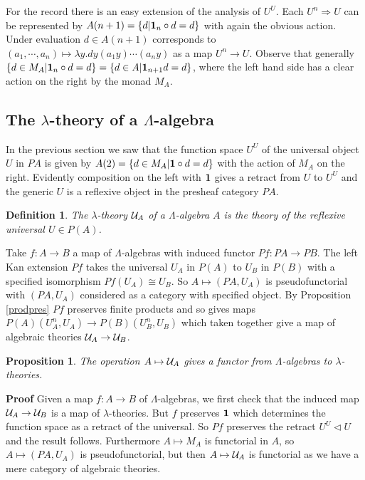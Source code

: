\documentclass[12pt, amstex, amssymb]{article}
\newtheorem{proposition}[theorem]{Proposition}
\newtheorem{definition}[theorem]{Definition}
\newcommand{\ret}{\triangleleft}
\newcommand{\mcat}{\cal}
\newcommand{\app}{{\bf 1}}
\begin{document}
For the record there is an easy extension of
the analysis of $U^U$. Each $U^n \Rightarrow U$ can be represented by
${A}(n+1) = \{ d | \app_n \circ d = d \}$ with again the obvious
action. Under evaluation $d \in A(n+1)$ corresponds to
$(a_1, \cdots , a_n) \mapsto \lambda y. dy(a_1y) \cdots (a_ny)$
as a map $U^n \to U$. Observe that generally 
$\{ d \in M_A | \app_n \circ d = d \} = \{d \in A | \app_{n+1}d = d \}$,
where the left hand side has a clear action on the right by
the monad $M_A$.

\subsection{The $\lambda$-theory of a $\Lambda$-algebra}
In the previous section we saw that the function space $U^U$ of
the universal object $U$ in $PA$ is given 
by $A(2) = \{d \in M_A | \app \circ d = d \}$ with the 
action of $M_A$ on the right. Evidently composition 
on the left with $\app$ gives a retract from $U$ to $U^U$
and the generic $U$ is a reflexive object in the 
presheaf category $PA$. 

\begin{definition}
The $\lambda$-theory ${\mcat U}_A$ 
of a $\Lambda$-algebra $A$ is the theory 
of the reflexive universal $U \in P(A)$. 
\end{definition}
Take $f: A \to B$ a map of $\Lambda$-algebras
with induced functor $Pf: PA \to PB$.
The left Kan extension $Pf$ takes the universal $U_A$ in $P(A)$ to 
$U_B$ in $P(B)$ with a specified isomorphism
$Pf(U_A) \cong U_B$. So
$A \mapsto (PA,U_A)$ is pseudofunctorial with $(PA,U_A)$
considered as a category with specified object. 
By Proposition \ref{prodpres} $Pf$ preserves finite
products and so gives maps 
$P(A)(U_A^n,U_A) \to P(B)(U_B^n,U_B)$
which taken together give a map of algebraic 
theories ${\mcat U}_A \to {\mcat U}_B$.
\begin{proposition}\label{universal}
The operation $A \mapsto {\mcat U}_A$ gives a functor
from $\Lambda$-algebras to $\lambda$-theories. 
\end{proposition}
{\bf Proof}
Given a map $f:A \to B$ of $\Lambda$-algebras, we first 
check that the induced map ${\mcat U}_A \to {\mcat U}_B$
is a map of $\lambda$-theories. But $f$ preserves $\app$
which determines the function space as a retract of the
universal. So $Pf$ preserves the retract $U^U \ret U$
and the result follows. Furthermore $A \mapsto M_A$ is functorial
in $A$, so $A \mapsto (PA,U_A)$ is pseudofunctorial, but then
$A \mapsto {\mcat U}_A$ is functorial as we have a mere
category of algebraic theories.
\end{document}
